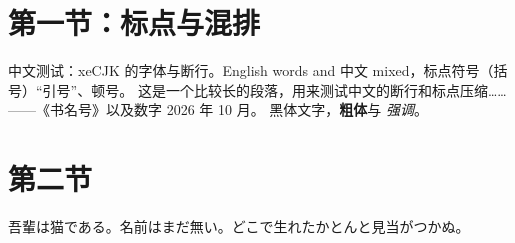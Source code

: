 \documentclass{article}
\begin{document}
\section{第一节：标点与混排}
中文测试：xeCJK 的字体与断行。English words and 中文 mixed，标点符号（括号）“引号”、顿号。
这是一个比较长的段落，用来测试中文的断行和标点压缩……——《书名号》以及数字 2026 年 10 月。
{\sffamily 黑体文字，\textbf{粗体}与 \emph{强调}。}

\section{第二节}
吾輩は猫である。名前はまだ無い。どこで生れたかとんと見当がつかぬ。
\end{document}
